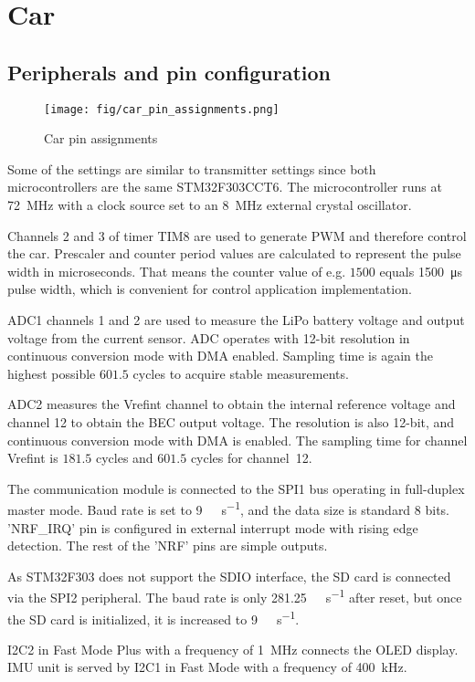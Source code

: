 \section{Car}
\subsection{Peripherals and pin configuration}
\label{sub:car_conf}
\begin{figure}[h]
\centering
\texttt{[image: fig/car\_pin\_assignments.png]}
\caption{Car pin assignments}
\label{fig:car_conf}
\end{figure}
Some of the settings are similar to transmitter settings since both microcontrollers are the same STM32F303CCT6. The microcontroller runs at \SI{72}{\MHz} with a clock source set to an \SI{8}{\MHz} external crystal oscillator.

Channels 2 and 3 of timer TIM8 are used to generate PWM and therefore control the car. Prescaler and counter period values are calculated to represent the pulse width in microseconds. That means the counter value of e.g. $1500$ equals \SI{1500}{\micro\second} pulse width, which is convenient for control application implementation.

ADC1 channels 1 and 2 are used to measure the LiPo battery voltage and output voltage from the current sensor. ADC operates with 12-bit resolution in continuous conversion mode with DMA enabled. Sampling time is again the highest possible $601.5$ cycles to acquire stable measurements.

ADC2 measures the Vrefint channel to obtain the internal reference voltage and channel 12 to obtain the BEC output voltage. The resolution is also 12-bit, and continuous conversion mode with DMA is enabled. The sampling time for channel Vrefint is $181.5$ cycles and $601.5$ cycles for channel~12.

The communication module is connected to the SPI1 bus operating in full-duplex master mode. Baud rate is set to \SI{9}{\mega\bit\per\second}, and the data size is standard 8 bits. 'NRF\_IRQ' pin is configured in external interrupt mode with rising edge detection. The rest of the 'NRF' pins are simple outputs.

As STM32F303 does not support the SDIO interface, the SD card is connected via the SPI2 peripheral. The baud rate is only \SI{281.25}{\kilo\bit\per\second} after reset, but once the SD card is initialized, it is increased to \SI{9}{\mega\bit\per\second}.

I2C2 in Fast Mode Plus with a frequency of \SI{1}{\MHz} connects the OLED display. IMU unit is served by I2C1 in Fast Mode with a frequency of \SI{400}{\kHz}.

